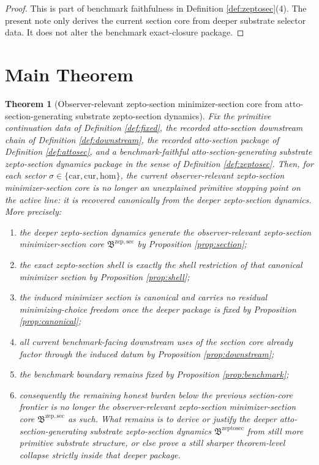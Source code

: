 \documentclass[11pt]{article}
\newcommand{\Car}{\mathrm{car}}
\newcommand{\Cur}{\mathrm{cur}}
\newcommand{\Hom}{\mathrm{hom}}
\newcommand{\ZeptoSectionPackage}{\mathfrak B^{\mathrm{zeptosec}}}
\newcommand{\ZeptoMinSectionCore}{\mathfrak B^{\mathrm{zep,sec}}}
\newtheorem{theorem}{Theorem}
\begin{document}
\begin{proof}
This is part of benchmark faithfulness in Definition \ref{def:zeptosec}(4). The present note only derives the current section core from deeper substrate selector data. It does not alter the benchmark exact-closure package.
\end{proof}

\section{Main Theorem}

\begin{theorem}[Observer-relevant zepto-section minimizer-section core from atto-section-generating substrate zepto-section dynamics]
\label{thm:main}
Fix the primitive continuation data of Definition \ref{def:fixed}, the recorded atto-section downstream chain of Definition \ref{def:downstream}, the recorded atto-section package of Definition \ref{def:attosec}, and a benchmark-faithful atto-section-generating substrate zepto-section dynamics package in the sense of Definition \ref{def:zeptosec}. Then, for each sector \(\sigma\in\{\Car,\Cur,\Hom\}\), the current observer-relevant zepto-section minimizer-section core is no longer an unexplained primitive stopping point on the active line: it is recovered canonically from the deeper zepto-section dynamics. More precisely:
\begin{enumerate}
    \item the deeper zepto-section dynamics generate the observer-relevant zepto-section minimizer-section core \(\ZeptoMinSectionCore\) by Proposition \ref{prop:section};
    \item the exact zepto-section shell is exactly the shell restriction of that canonical minimizer section by Proposition \ref{prop:shell};
    \item the induced minimizer section is canonical and carries no residual minimizing-choice freedom once the deeper package is fixed by Proposition \ref{prop:canonical};
    \item all current benchmark-facing downstream uses of the section core already factor through the induced datum by Proposition \ref{prop:downstream};
    \item the benchmark boundary remains fixed by Proposition \ref{prop:benchmark};
    \item consequently the remaining honest burden below the previous section-core frontier is no longer the observer-relevant zepto-section minimizer-section core \(\ZeptoMinSectionCore\) as such. What remains is to derive or justify the deeper atto-section-generating substrate zepto-section dynamics \(\ZeptoSectionPackage\) from still more primitive substrate structure, or else prove a still sharper theorem-level collapse strictly inside that deeper package.
\end{enumerate}
\end{theorem}
\end{document}
